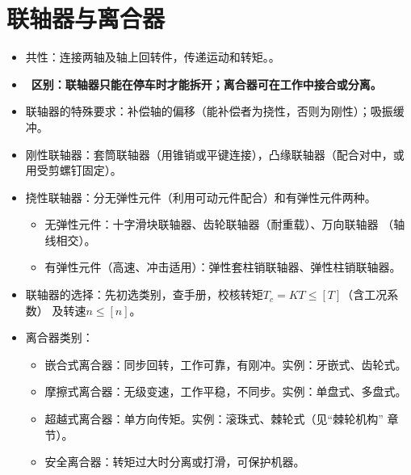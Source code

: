 \documentclass[12pt,a4paper]{article}
\newcommand{\tightlist}{\setlength{\parskip}{0pt}\setlength{\itemsep}{0pt}}
\newcommand{\hint}[1]{\textsf{（#1）}}
\newcommand{\minor}[1]{{\color{gray} #1}}
\renewcommand{\emph}[1]{\faIcon[regular]{lightbulb}\ \textbf{#1}}
\begin{document}
\section{联轴器与离合器}
\begin{itemize}\tightlist
    \item 共性：连接两轴及轴上回转件，传递运动和转矩。。
    \item \emph{区别：联轴器只能在停车时才能拆开；离合器可在工作中接合或分离。}
    \item 联轴器的特殊要求：补偿轴的偏移\hint{能补偿者为挠性，否则为刚性}；吸振缓冲。
    \item 刚性联轴器：套筒联轴器\hint{用锥销或平键连接}，凸缘联轴器\hint{配合对中，或
    用受剪螺钉固定}。
    \item 挠性联轴器：分无弹性元件\hint{利用可动元件配合}和有弹性元件两种。
    \begin{itemize}\tightlist
        \item 无弹性元件：十字滑块联轴器、齿轮联轴器\hint{耐重载}、万向联轴器
        \hint{轴线相交}。
        \item 有弹性元件\hint{高速、冲击适用}：弹性套柱销联轴器、弹性柱销联轴器。
    \end{itemize}
    \item 联轴器的选择：先初选类别，查手册，校核转矩$T_c=KT\leq[T]$\hint{含工况系数}
    及转速$n\leq[n]$。
    \item 离合器类别：
    \begin{itemize}\tightlist
        \item 嵌合式离合器：同步回转，工作可靠，有刚冲。实例：牙嵌式、齿轮式。
        \item 摩擦式离合器：无级变速，工作平稳，不同步。实例：单盘式、多盘式。
        \item \minor{超越式离合器：单方向传矩。实例：滚珠式、棘轮式\hint{见“棘轮机构”
        章节}。}
        \item \minor{安全离合器：转矩过大时分离或打滑，可保护机器。}
    \end{itemize}
\end{itemize}
\end{document}
